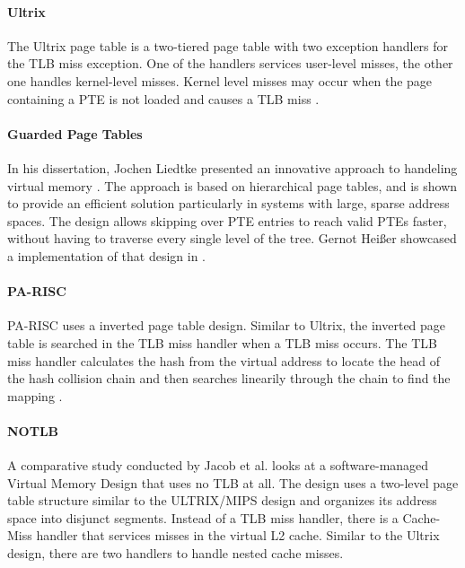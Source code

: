 \paragraph{Ultrix} The Ultrix page table is a two-tiered page table with two exception handlers for the TLB miss exception.
One of the handlers services user-level misses, the other one handles kernel-level misses.
Kernel level misses may occur when the page containing a PTE is not loaded and causes a
TLB miss \cite{jacob1998look}.

\paragraph{Guarded Page Tables} In his dissertation, Jochen Liedtke presented an innovative approach
to handeling virtual memory \cite{liedtkeGPT}.
The approach is based on hierarchical page tables, and is shown to provide an efficient solution particularly in systems with large, sparse address spaces.
The design allows skipping over PTE entries to reach valid PTEs faster, without having to traverse every single level of the tree.
Gernot Heißer showcased a implementation of that design in \cite{heiserAnatomyHighPerformanceMicrokernel}.

\paragraph{PA-RISC}
PA-RISC uses a inverted page table design. Similar to Ultrix, the inverted page table is searched in the TLB miss handler when a TLB miss occurs.
The TLB miss handler calculates the hash from the virtual address to locate the head of the hash collision chain and then searches linearily through the chain to find the mapping \cite{jacob1998look}.

\paragraph{NOTLB}
A comparative study conducted by Jacob et al. \cite{jacob1998look} looks at a software-managed Virtual Memory Design that uses no TLB at all.
The design uses a two-level page table structure similar to the ULTRIX/MIPS design and organizes its address space into disjunct segments.
Instead of a TLB miss handler, there is a Cache-Miss handler that services misses in the virtual L2 cache.
Similar to the Ultrix design, there are two handlers to handle nested cache misses.










